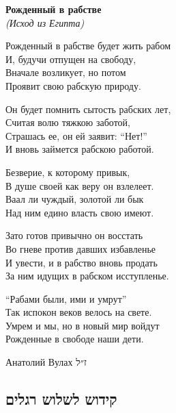 \documentclass[11pt,twoside]{article}
\begin{document}
\begin{russian}
\footnotesize%
\setlength{\parskip}{1em}%
\textbf{Рожденный в рабстве}\\
\textit{(Исход из Египта)}
 
Рожденный в рабстве будет жить рабом\\
И, будучи отпущен на свободу,\\
Вначале возликует, но потом\\
Проявит свою рабскую природу.
 
Он будет помнить сытость рабских лет,\\
Считая волю тяжкою заботой,\\
Страшась ее, он ей заявит: “Нет!”\\
И вновь займется рабскою работой.
 
Безверие, к которому привык,\\
В душе своей как веру он взлелеет.\\
Ваал ли чуждый, золотой ли бык\\
Над ним едино власть свою имеют.
 
Зато готов привычно он восстать\\
Во гневе против давших избавленье\\
И увести, и в рабство вновь продать\\
За ним идущих в рабском исступленье.
 
“Рабами были, ими и умрут” \textemdash{}\\
Так испокон веков велось на свете.\\
Умрем и мы, но в новый мир войдут\\
Рожденные в свободе наши дети.

\hfill Анатолий Вулах {\prose ז״ל}
\end{russian}

\newpage

\subsection{קידוש לשלוש רגלים}
\end{document}
